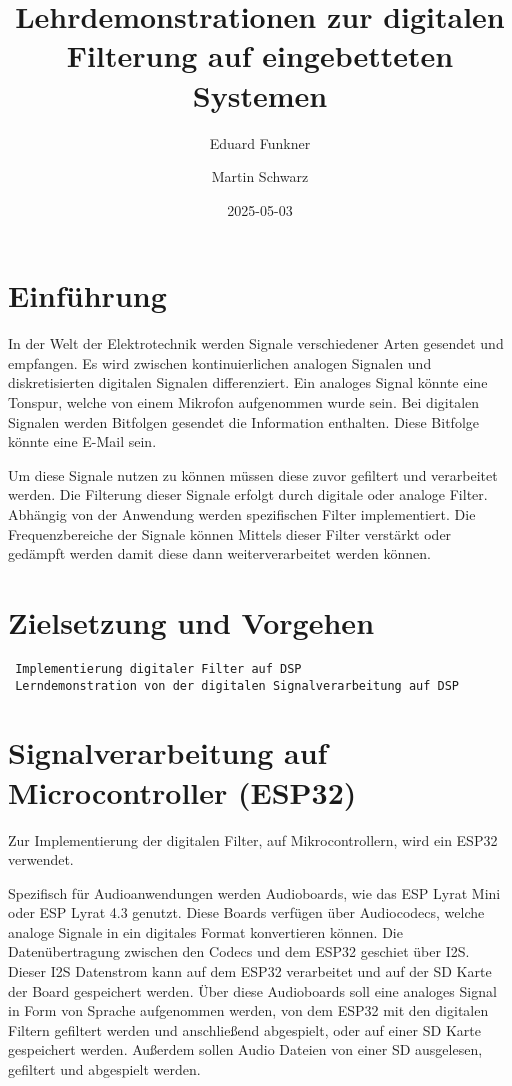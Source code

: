 \documentclass[
  ngerman,
  letterpaper,
  DIV=11]{scrreprt}
\title{Lehrdemonstrationen zur digitalen Filterung auf eingebetteten
Systemen}
\author{Eduard Funkner \and Martin Schwarz}
\date{2025-05-03}
\renewcommand*\contentsname{Inhaltsverzeichnis}
\newcommand\contentsname{Inhaltsverzeichnis}
\begin{document}
\maketitle

\renewcommand*\contentsname{Inhaltsverzeichnis}
{
\hypersetup{linkcolor=}
\setcounter{tocdepth}{2}
\tableofcontents
}

\chapter{Einführung}\label{einfuxfchrung}

In der Welt der Elektrotechnik werden Signale verschiedener Arten
gesendet und empfangen. Es wird zwischen kontinuierlichen analogen
Signalen und diskretisierten digitalen Signalen differenziert. Ein
analoges Signal könnte eine Tonspur, welche von einem Mikrofon
aufgenommen wurde sein. Bei digitalen Signalen werden Bitfolgen gesendet
die Information enthalten. Diese Bitfolge könnte eine E-Mail sein.

Um diese Signale nutzen zu können müssen diese zuvor gefiltert und
verarbeitet werden. Die Filterung dieser Signale erfolgt durch digitale
oder analoge Filter. Abhängig von der Anwendung werden spezifischen
Filter implementiert. Die Frequenzbereiche der Signale können Mittels
dieser Filter verstärkt oder gedämpft werden damit diese dann
weiterverarbeitet werden können.

\chapter{Zielsetzung und Vorgehen}\label{zielsetzung-und-vorgehen}

\begin{verbatim}
 Implementierung digitaler Filter auf DSP
 Lerndemonstration von der digitalen Signalverarbeitung auf DSP
\end{verbatim}

\chapter{Signalverarbeitung auf Microcontroller
(ESP32)}\label{signalverarbeitung-auf-microcontroller-esp32}

Zur Implementierung der digitalen Filter, auf Mikrocontrollern, wird ein
ESP32 verwendet.

Spezifisch für Audioanwendungen werden Audioboards, wie das ESP Lyrat
Mini oder ESP Lyrat 4.3 genutzt. Diese Boards verfügen über Audiocodecs,
welche analoge Signale in ein digitales Format konvertieren können. Die
Datenübertragung zwischen den Codecs und dem ESP32 geschiet über I2S.
Dieser I2S Datenstrom kann auf dem ESP32 verarbeitet und auf der SD
Karte der Board gespeichert werden. Über diese Audioboards soll eine
analoges Signal in Form von Sprache aufgenommen werden, von dem ESP32
mit den digitalen Filtern gefiltert werden und anschließend abgespielt,
oder auf einer SD Karte gespeichert werden. Außerdem sollen Audio
Dateien von einer SD ausgelesen, gefiltert und abgespielt werden.
\end{document}

